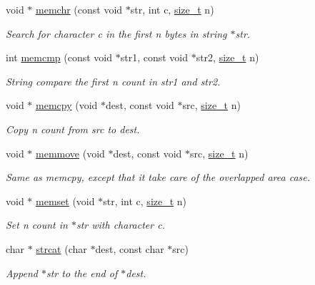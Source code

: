 \begin{DoxyCompactItemize}
\item 
void $\ast$ \mbox{\hyperlink{a00128_af2c756015b1cb92274fc019a175ae8bb}{memchr}} (const void $\ast$str, int c, \mbox{\hyperlink{a00131_a43b4547e12226fef871eed8afe191ad7}{size\+\_\+t}} n)
\begin{DoxyCompactList}\small\item\em Search for character c in the first n bytes in string $\ast$str. \end{DoxyCompactList}\item 
int \mbox{\hyperlink{a00128_ace6c4869ab3af01c6f27eac47773917a}{memcmp}} (const void $\ast$str1, const void $\ast$str2, \mbox{\hyperlink{a00131_a43b4547e12226fef871eed8afe191ad7}{size\+\_\+t}} n)
\begin{DoxyCompactList}\small\item\em String compare the first n count in str1 and str2. \end{DoxyCompactList}\item 
void $\ast$ \mbox{\hyperlink{a00128_a14938524dcbeb59d7117ba5e151ad1b1}{memcpy}} (void $\ast$dest, const void $\ast$src, \mbox{\hyperlink{a00131_a43b4547e12226fef871eed8afe191ad7}{size\+\_\+t}} n)
\begin{DoxyCompactList}\small\item\em Copy n count from src to dest. \end{DoxyCompactList}\item 
void $\ast$ \mbox{\hyperlink{a00128_a802c986820d3866639922b6bc9484f90}{memmove}} (void $\ast$dest, const void $\ast$src, \mbox{\hyperlink{a00131_a43b4547e12226fef871eed8afe191ad7}{size\+\_\+t}} n)
\begin{DoxyCompactList}\small\item\em Same as memcpy, except that it take care of the overlapped area case. \end{DoxyCompactList}\item 
void $\ast$ \mbox{\hyperlink{a00128_a48a16bf628904bdd1b28cbaedf934868}{memset}} (void $\ast$str, int c, \mbox{\hyperlink{a00131_a43b4547e12226fef871eed8afe191ad7}{size\+\_\+t}} n)
\begin{DoxyCompactList}\small\item\em Set n count in $\ast$str with character c. \end{DoxyCompactList}\item 
char $\ast$ \mbox{\hyperlink{a00128_adb8723e585ed29f2370cddf90f6891bc}{strcat}} (char $\ast$dest, const char $\ast$src)
\begin{DoxyCompactList}\small\item\em Append $\ast$str to the end of $\ast$dest. \end{DoxyCompactList}\item 

\end{DoxyCompactItemize}

